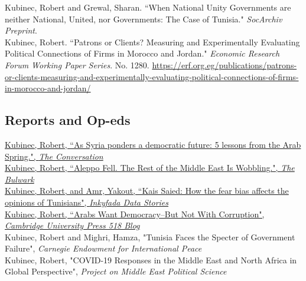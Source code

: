 \documentclass[11pt, a4paper]{article}
\newcommand{\years}[1]{\marginnote{\scriptsize #1}}
\begin{document}
\years{2019} Kubinec, Robert and Grewal, Sharan. ``When National Unity Governments are neither National, United, nor Governments: The Case of Tunisia." \emph{SocArchiv Preprint}. \\

\years{2018} Kubinec, Robert. ``Patrons or Clients? Measuring and Experimentally Evaluating Political Connections of Firms in Morocco and Jordan." \emph{Economic Research Forum Working Paper Series}. No. 1280. \url{https://erf.org.eg/publications/patrons-or-clients-measuring-and-experimentally-evaluating-political-connections-of-firms-in-morocco-and-jordan/}\\

\subsection*{Reports and Op-eds}
\noindent

\years{2025}\href{https://theconversation.com/as-syria-ponders-a-democratic-future-5-lessons-from-the-arab-spring-246203}{Kubinec, Robert, ``As Syria ponders a democratic future: 5 lessons from the Arab Spring.", \emph{The Conversation}}\\

\years{2024}\href{https://www.thebulwark.com/p/aleppo-fell-the-rest-of-the-middle-east-is-wobbling/}{Kubinec, Robert, ``Aleppo Fell. The Rest of the Middle East Is Wobbling.", \emph{The Bulwark}}\\

\years{2023}\href{https://inkyfada.com/en/2023/10/27/kais-saied-fear-bias-opinions-tunisians/}{Kubinec, Robert, and Amr, Yakout, ``Kais Saied: How the fear bias affects the opinions of Tunisians", \emph{Inkyfada Data Stories}}\\

\years{2023}\href{https://www.cambridgeblog.org/2023/07/arabs-want-democracy-but-not-with-corruption/}{Kubinec, Robert, ``Arabs Want Democracy--But Not With Corruption", \emph{Cambridge University Press 518 Blog}}\\

\years{2022}Kubinec, Robert and Mighri, Hamza, "Tunisia Faces the Specter of Government Failure", \emph{Carnegie Endowment for International Peace}\\

\years{2022}Kubinec, Robert, "COVID-19 Responses in the Middle East and North Africa in Global Perspective", \emph{Project on Middle East Political Science}\\
\end{document}
